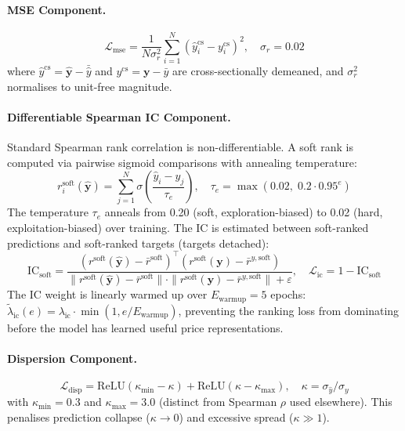 \documentclass[a4paper,11pt]{report}
\begin{document}
\paragraph{MSE Component.}
\begin{equation}
\mathcal{L}_{\text{mse}} = \frac{1}{N\sigma_r^2}\sum_{i=1}^{N}\!\left(\hat{y}^{\text{cs}}_i - y^{\text{cs}}_i\right)^2, \quad \sigma_r = 0.02
\end{equation}
where $\hat{y}^{\text{cs}} = \hat{\mathbf{y}}-\bar{\hat{y}}$ and $y^{\text{cs}}=\mathbf{y}-\bar{y}$ are cross-sectionally demeaned, and $\sigma_r^2$ normalises to unit-free magnitude.

\paragraph{Differentiable Spearman IC Component.}
Standard Spearman rank correlation is non-differentiable. A soft rank is computed via pairwise sigmoid comparisons with annealing temperature:
\begin{equation}
r^{\text{soft}}_i(\hat{\mathbf{y}}) = \sum_{j=1}^{N}\sigma\!\left(\frac{\hat{y}_i - \hat{y}_j}{\tau_e}\right), \quad \tau_e = \max(0.02,\; 0.2\cdot 0.95^e)
\end{equation}
The temperature $\tau_e$ anneals from 0.20 (soft, exploration-biased) to 0.02 (hard, exploitation-biased) over training. The IC is estimated between soft-ranked predictions and soft-ranked targets (targets detached):
\begin{equation}
\text{IC}_{\text{soft}} = \frac{(r^{\text{soft}}(\hat{\mathbf{y}})-\bar{r}^{\text{soft}})^{\top}(r^{\text{soft}}(\mathbf{y})-\bar{r}^{y,\text{soft}})}{\|r^{\text{soft}}(\hat{\mathbf{y}})-\bar{r}^{\text{soft}}\|\cdot\|r^{\text{soft}}(\mathbf{y})-\bar{r}^{y,\text{soft}}\|+\varepsilon}, \quad
\mathcal{L}_{\text{ic}} = 1 - \text{IC}_{\text{soft}}
\end{equation}
The IC weight is linearly warmed up over $E_{\text{warmup}}=5$ epochs: $\tilde{\lambda}_{\text{ic}}(e)=\lambda_{\text{ic}}\cdot\min(1,e/E_{\text{warmup}})$, preventing the ranking loss from dominating before the model has learned useful price representations.

\paragraph{Dispersion Component.}
\begin{equation}
\mathcal{L}_{\text{disp}} = \text{ReLU}(\kappa_{\min}-\kappa) + \text{ReLU}(\kappa-\kappa_{\max}), \quad \kappa = \sigma_{\hat{y}}/\sigma_y
\end{equation}
with $\kappa_{\min}=0.3$ and $\kappa_{\max}=3.0$ (distinct from Spearman $\rho$ used elsewhere). This penalises prediction collapse ($\kappa\to 0$) and excessive spread ($\kappa\gg 1$).
\end{document}
